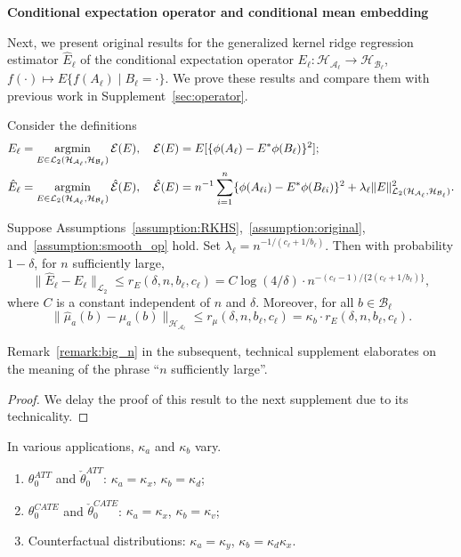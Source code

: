 \textbf{Conditional expectation operator and conditional mean embedding}

Next, we present original results for the generalized kernel ridge regression estimator $\hat{E}_{\ell}$ of the conditional expectation operator $E_{\ell}:\mathcal{H}_{\mathcal{A}_{\ell}}\rightarrow\mathcal{H}_{\mathcal{B}_{\ell}}$, $f(\cdot)\mapsto E\{f(A_{\ell}) \mid B_{\ell}=\cdot\}$. We prove these results and compare them with previous work in Supplement~\ref{sec:operator}.

Consider the definitions
\begin{align*}
    E_{\ell}&=\operatorname*{\arg\!\min}_{E\in\mathcal{L}_2(\mathcal{H}_{\mathcal{A}_{\ell}},\mathcal{H}_{\mathcal{B}_{\ell}})}\mathcal{E}(E),\quad \mathcal{E}(E)=E[\{\phi(A_{\ell})-E^*\phi(B_{\ell})\}^2]; \\
    \hat{E}_{\ell}&=\operatorname*{\arg\!\min}_{E\in\mathcal{L}_2(\mathcal{H}_{\mathcal{A}_{\ell}},\mathcal{H}_{\mathcal{B}_{\ell}})}\hat{\mathcal{E}}(E),\quad \hat{\mathcal{E}}(E)=n^{-1}\sum_{i=1}^n\{\phi(A_{\ell i})-E^*\phi(B_{\ell i})\}^2+\lambda_{\ell}\|E\|^2_{\mathcal{L}_2(\mathcal{H}_{\mathcal{A}_{\ell}},\mathcal{H}_{\mathcal{B}_{\ell}})}.
\end{align*}

\begin{proposition}\label{theorem:conditional}
Suppose Assumptions~\ref{assumption:RKHS},~\ref{assumption:original}, and~\ref{assumption:smooth_op} hold. Set $\lambda_{\ell}=n^{-1/(c_{\ell}+1/b_{\ell})}$. Then with probability $1-\delta$, for $n$ sufficiently large,
$$
\|\hat{E}_{\ell}-E_{\ell}\|_{\mathcal{L}_2}\leq r_E(\delta,n,b_{\ell},c_{\ell})=C\log(4/\delta)\cdot n^{-(c_{\ell}-1)/\{2(c_{\ell}+1/b_{\ell})\}},
$$
where $C$ is a constant independent of $n$ and $\delta$. Moreover, for all $b\in\mathcal{B}_{\ell}$
$$
  \|\hat{\mu}_a(b)-\mu_a(b)\|_{\mathcal{H}_{\mathcal{A}_{\ell}}}\leq r_{\mu}(\delta,n,b_{\ell},c_{\ell})=\kappa_{b}\cdot
  r_E(\delta,n,b_{\ell},c_{\ell}).
    $$
\end{proposition}

Remark~\ref{remark:big_n} in the subsequent, technical supplement elaborates on the meaning of the phrase ``$n$ sufficiently large''.

\begin{proof}
We delay the proof of this result to the next supplement due to its technicality.
\end{proof}

\begin{remark}\label{remark:3}
In various applications, $\kappa_a$ and $\kappa_b$ vary.
    \begin{enumerate}
        \item $\theta_0^{ATT}$ and $\check{\theta}_0^{ATT}$: $\kappa_a=\kappa_x$, $\kappa_b=\kappa_d$;
        \item $\theta_0^{CATE}$ and $\check{\theta}_0^{CATE}$: $\kappa_a=\kappa_x$, $\kappa_b=\kappa_v$;
        \item Counterfactual distributions: $\kappa_a=\kappa_y$, $\kappa_b=\kappa_d\kappa_x$.
    \end{enumerate}
\end{remark}


